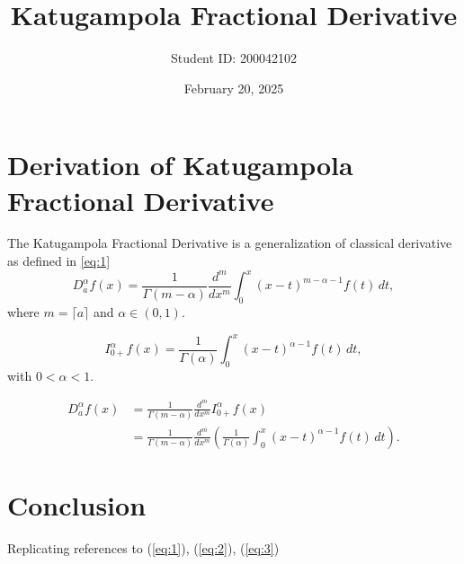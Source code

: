 \documentclass[a4paper,12pt]{article}
\title{Katugampola Fractional Derivative}
\author{Student ID: 200042102}
\date{February 20, 2025}
\begin{document}
	
	\maketitle
	
	\section{Derivation of Katugampola Fractional Derivative}
	The Katugampola Fractional Derivative is a generalization of classical derivative as defined in \autoref{eq:1}
	\begin{equation} \label{eq:1}
		D^\alpha_a f(x) = \frac{1}{\Gamma(m-\alpha)} \frac{d^m}{dx^m} \int_{0}^{x} (x-t)^{m-\alpha-1} f(t) \, dt,
	\end{equation}
	where $m=\lceil a \rceil$ and $\alpha \in (0,1)$.
	
	\begin{equation} \label{eq:2}
		I^\alpha_{0+} f(x) = \frac{1}{\Gamma(\alpha)} \int_{0}^{x} (x-t)^{\alpha-1} f(t) \, dt,
	\end{equation}
	with $0 < \alpha < 1$.
	
	\begin{equation} \label{eq:3}
		\begin{split}
			D^\alpha_a f(x) &= \frac{1}{\Gamma(m-\alpha)} \frac{d^m}{dx^m} \textit{I}^{\alpha}_{0+} f(x) \\
			&= \frac{1}{\Gamma(m-\alpha)} \frac{d^m}{dx^m} \left(\frac{1}{\Gamma(\alpha)} \int_{0}^{x} (x-t)^{\alpha-1} f(t) \, dt \right).
		\end{split}
	\end{equation}
	
	\section{Conclusion}
	Replicating references to (\ref{eq:1}),  (\ref{eq:2}),  (\ref{eq:3})
	
\end{document}
